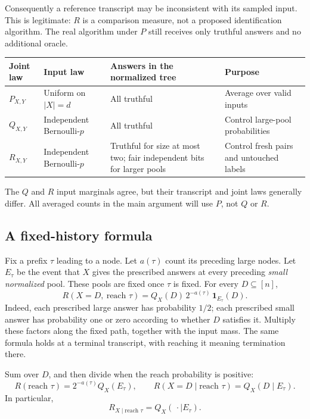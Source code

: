 \documentclass[11pt]{article}
\theoremstyle{definition}
\theoremstyle{remark}
\numberwithin{equation}{section}
\begin{document}
Consequently a reference transcript may be inconsistent with its
sampled input. This is legitimate: \(R\) is a comparison measure,
not a proposed identification algorithm. The real algorithm under
\(P\) still receives only truthful answers and no additional oracle.

\begin{center}
\begin{tabularx}{\linewidth}{lYYY}
\toprule
Joint law&Input law&Answers in the normalized tree&Purpose\\
\midrule
\(P_{X,Y}\)&Uniform on \(|X|=d\)&All truthful&
Average over valid inputs\\
\(Q_{X,Y}\)&Independent Bernoulli-\(p\)&All truthful&
Control large-pool probabilities\\
\(R_{X,Y}\)&Independent Bernoulli-\(p\)&Truthful for size at most two;
fair independent bits for larger pools&
Control fresh pairs and untouched labels\\
\bottomrule
\end{tabularx}
\end{center}
The \(Q\) and \(R\) input marginals agree, but their transcript and
joint laws generally differ. All averaged counts in the main
argument will use \(P\), not \(Q\) or \(R\).

\subsection{A fixed-history formula}\label{subsec:history}

Fix a prefix \(\tau\) leading to a node. Let \(a(\tau)\) count its
preceding large nodes. Let \(E_\tau\) be the event that \(X\) gives
the prescribed answers at every preceding \emph{small normalized}
pool. These pools are fixed once \(\tau\) is fixed.
For every \(D\subseteq[n]\),
\begin{equation}\label{eq:historyformula}
 R(X=D,\ \text{reach }\tau)
 =Q_X(D)\,2^{-a(\tau)}\,\mathbf1_{E_\tau}(D).
\end{equation}
Indeed, each prescribed large answer has probability \(1/2\);
each prescribed small answer has probability one or zero according
to whether \(D\) satisfies it. Multiply these factors along the
fixed path, together with the input mass.
The same formula holds at a terminal transcript, with reaching it
meaning termination there.

Sum over \(D\), and then divide when the reach probability is positive:
\[
 R(\text{reach }\tau)=2^{-a(\tau)}Q_X(E_\tau),\qquad
 R(X=D\mid\text{reach }\tau)=Q_X(D\mid E_\tau).
\]
In particular,
\begin{equation}\label{eq:posterior}
 R_{X\mid\text{reach }\tau}=Q_X(\,\cdot\mid E_\tau).
\end{equation}
\end{document}
